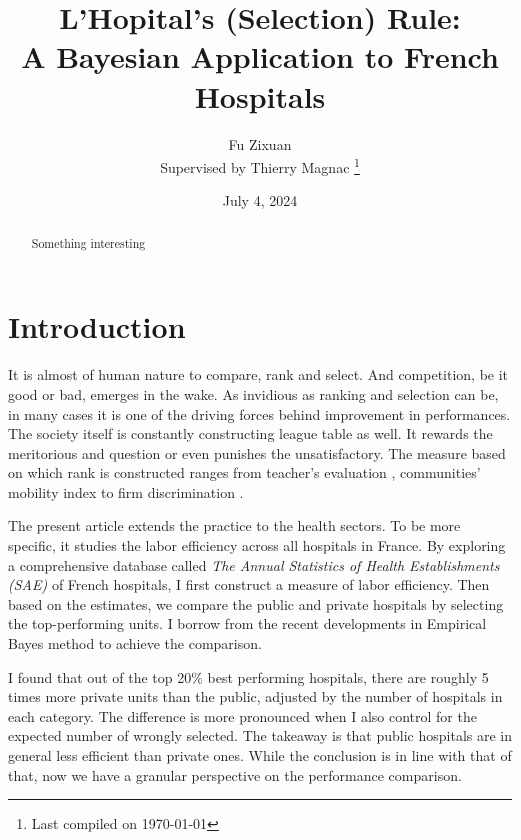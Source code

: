 \documentclass[12pt]{article}
\title{L'Hopital's (Selection) Rule:\\ A Bayesian Application to French Hospitals}
\author{Fu Zixuan \\
    Supervised by Thierry Magnac \thanks{Last compiled on \today}}
\date{July 4, 2024}
\begin{document}
\maketitle

\begin{abstract}
    \noindent  Something interesting\\


    \bigskip
\end{abstract}

\newpage
\tableofcontents
\newpage

\section{Introduction}

It is almost of human nature to compare, rank and select. And competition, be
it good or bad, emerges in the wake. As invidious as ranking and selection can
be, in many cases it is one of the driving forces behind improvement in
performances. The society itself is constantly constructing league table as
well. It rewards the meritorious and question or even punishes the
unsatisfactory. The measure based on which rank is constructed ranges from
teacher's evaluation \citep{chetty2014measuring}, communities' mobility index
\citep{chetty2018impacts} to firm discrimination \citep{kline2022systemic}.

The present article extends the practice to the health sectors. To be more
specific, it studies the labor efficiency across all hospitals in France. By
exploring a comprehensive database called \textit{The Annual Statistics of
    Health Establishments (SAE)} of French hospitals, I first construct a measure
of labor efficiency. Then based on the estimates, we compare the public and
private hospitals by selecting the top-performing units. I borrow from the
recent developments in Empirical Bayes method to achieve the comparison.

I found that out of the top 20\% best performing hospitals, there are roughly 5
times more private units than the public, adjusted by the number of hospitals
in each category. The difference is more pronounced when I also control for the
expected number of wrongly selected. The takeaway is that public hospitals are
in general less efficient than private ones. While the conclusion is in line
with that of \cite{croiset2024hospitals} that, now we have a granular
perspective on the performance comparison.
\end{document}
